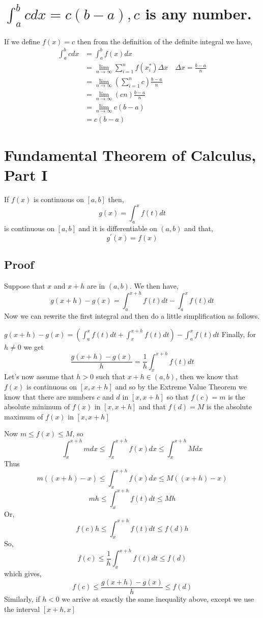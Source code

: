 \documentclass[10pt]{article}
\begin{document}
\section{$\int_{a}^{b} c d x=c(b-a), c$ is any number.}
If we define $f(x)=c$ then from the definition of the definite integral we have,
$$
\begin{aligned}
\int_{a}^{b} c d x &=\int_{a}^{b} f(x) d x \\
&=\lim _{n \rightarrow \infty} \sum_{i=1}^{n} f\left(x_{i}^{*}\right) \Delta x \quad \Delta x=\frac{b-a}{n} \\
&=\lim _{n \rightarrow \infty}\left(\sum_{i=1}^{n} c\right) \frac{b-a}{n} \\
&=\lim _{n \rightarrow \infty}(c n) \frac{b-a}{n} \\
&=\lim _{n \rightarrow \infty} c(b-a) \\
&=c(b-a)
\end{aligned}
$$

\section{Fundamental Theorem of Calculus, Part I}
If $f(x)$ is continuous on $[a, b]$ then,
$$
g(x)=\int_{a}^{x} f(t) d t
$$
is continuous on $[a, b]$ and it is differentiable on $(a, b)$ and that,
$$
g^{\prime}(x)=f(x)
$$

\subsection{Proof}
Suppose that $x$ and $x+h$ are in $(a, b)$. We then have,
$$
g(x+h)-g(x)=\int_{a}^{x+h} f(t) d t-\int_{a}^{x} f(t) d t
$$
Now we can rewrite the first integral and then do a little simplification as follows.

$g(x+h)-g(x)=\left(\int_{a}^{x} f(t) d t+\int_{x}^{x+h} f(t) d t\right)-\int_{a}^{x} f(t) d t$ Finally, for $h \neq 0$ we get
$$
\frac{g(x+h)-g(x)}{h}=\frac{1}{h} \int_{x}^{x+h} f(t) d t
$$
Let's now assume that $h>0$ such that $x+h\in(a, b)$, then we know that $f(x)$ is continuous on $[x, x+h]$ and so by the Extreme Value Theorem we know that there are numbers $c$ and $d$ in $[x, x+h]$ so that $f(c)=m$ is the absolute minimum of $f(x)$ in $[x, x+h]$ and that $f(d)=M$ is the absolute maximum of $f(x)$ in $[x, x+h]$

Now $m \leq f(x) \leq M$, so
$$
\int_{x}^{x+h} m d x \leq \int_{x}^{x+h} f(x) d x \leq \int_{x}^{x+h} M d x
$$
Thus
$$
m((x+h)-x) \leq \int_{x}^{x+h} f(x) d x \leq M((x+h)-x)
$$
$$
m h \leq \int_{x}^{x+h} f(t) d t \leq M h
$$
Or,
$$
f(c) h \leq \int_{x}^{x+h} f(t) d t \leq f(d) h
$$
So,
$$
f(c) \leq \frac{1}{h} \int_{x}^{x+h} f(t) d t \leq f(d)
$$
which gives,
$$
f(c) \leq \frac{g(x+h)-g(x)}{h} \leq f(d)
$$
Similarly, if $h<0$ we arrive at exactly the same inequality above, except we use the interval $[x+h, x]$
\end{document}
